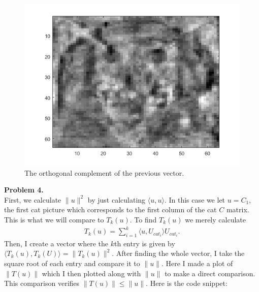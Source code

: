 \documentclass[leqno]{article}
\theoremstyle{nonumberplain}
\begin{document}
\begin{figure}[h]
\begin{center}
\includegraphics[scale=.4]{w_perp_dog.png}
\caption{The orthogonal complement of the previous vector.}
\end{center}
\end{figure}

\pagebreak




\noindent\textbf{Problem 4.} \\
First, we calculate $\|u\|^2$ by just calculating $\langle u,u\rangle$.  In this case we let $u=C_1$, the first cat picture which corresponds to the first column of the cat $C$ matrix.  This is what we will compare to $T_k(u)$.  To find $T_k(u)$ we merely calculate
\begin{align*}
T_k(u)=\sum_{i=1}^k \langle u, U_{{cat}_i} \rangle U_{{cat}_i}.
\end{align*}
Then, I create a vector where the $k$th entry is given by $\langle T_k(u),T_k(U)\rangle=\|T_k(u)\|^2$. After finding the whole vector, I take the square root of each entry and compare it to $\|u\|$.  Here I made a plot of $\|T(u)\|$ which I then plotted along with $\|u\|$ to make a direct comparison.  This comparison verifies $\|T(u)\|\leq \|u\|$. Here is the code snippet:
\end{document}
